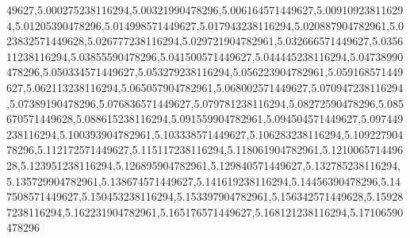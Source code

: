 49627,5.000275238116294,5.00321990478296,5.006164571449627,5.009109238116294,5.01205390478296,5.014998571449627,5.017943238116294,5.020887904782961,5.023832571449628,5.026777238116294,5.029721904782961,5.032666571449627,5.035611238116294,5.03855590478296,5.041500571449627,5.044445238116294,5.04738990478296,5.050334571449627,5.053279238116294,5.056223904782961,5.059168571449627,5.062113238116294,5.065057904782961,5.068002571449627,5.070947238116294,5.07389190478296,5.076836571449627,5.079781238116294,5.08272590478296,5.085670571449628,5.088615238116294,5.091559904782961,5.094504571449627,5.097449238116294,5.100393904782961,5.103338571449627,5.106283238116294,5.10922790478296,5.112172571449627,5.115117238116294,5.118061904782961,5.121006571449628,5.123951238116294,5.126895904782961,5.129840571449627,5.132785238116294,5.135729904782961,5.138674571449627,5.141619238116294,5.14456390478296,5.147508571449627,5.150453238116294,5.153397904782961,5.156342571449628,5.159287238116294,5.162231904782961,5.165176571449627,5.168121238116294,5.17106590478296
